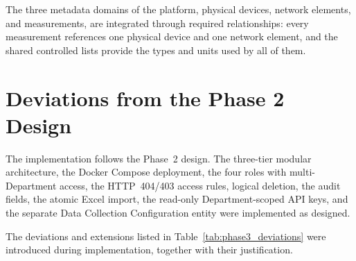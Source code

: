 \documentclass[11pt,a4paper]{article}
\begin{document}
The three metadata domains of the platform, physical devices, network
elements, and measurements, are integrated through required relationships:
every measurement references one physical device and one network element,
and the shared controlled lists provide the types and units used by all
of them.


\section{Deviations from the Phase 2 Design}

The implementation follows the Phase~2 design. The three-tier modular
architecture, the Docker Compose deployment, the four roles with
multi-Department access, the HTTP~404/403 access rules, logical deletion,
the audit fields, the atomic Excel import, the read-only Department-scoped
API keys, and the separate Data Collection Configuration entity were
implemented as designed.

The deviations and extensions listed in
Table~\ref{tab:phase3_deviations} were introduced during implementation,
together with their justification.
\end{document}
